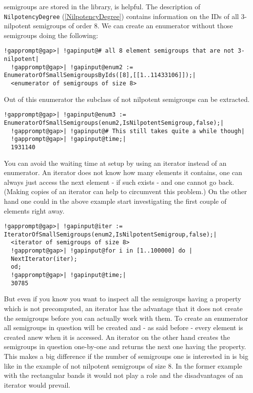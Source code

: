 \documentclass[a4paper,11pt]{report}
\begin{document}
{{{semigroups are stored in the library, is helpful. The description of \texttt{NilpotencyDegree} (\ref{NilpotencyDegree}) contains information on the IDs of all 3-nilpotent semigroups of order 8. We
can create an enumerator without those semigroups doing the following: 
\begin{Verbatim}[commandchars=!@|,fontsize=\small,frame=single,label=Example]
  !gapprompt@gap>| !gapinput@# all 8 element semigroups that are not 3-nilpotent|
  !gapprompt@gap>| !gapinput@enum2 := EnumeratorOfSmallSemigroupsByIds([8],[[1..11433106]]);|
  <enumerator of semigroups of size 8>
\end{Verbatim}
 Out of this enumerator the subclass of not nilpotent semigroups can be
extracted. 
\begin{Verbatim}[commandchars=!@|,fontsize=\small,frame=single,label=Example]
  !gapprompt@gap>| !gapinput@enum3 := EnumeratorOfSmallSemigroups(enum2,IsNilpotentSemigroup,false);|
  !gapprompt@gap>| !gapinput@# This still takes quite a while though|
  !gapprompt@gap>| !gapinput@time;|
  1931140
\end{Verbatim}
 You can avoid the waiting time at setup by using an iterator instead of an
enumerator. An iterator does not know how many elements it contains, one can
always just access the next element - if such exists - and one cannot go back.
(Making copies of an iterator can help to circumvent this problem.) On the
other hand one could in the above example start investigating the first couple
of elements right away. 
\begin{Verbatim}[commandchars=!@|,fontsize=\small,frame=single,label=Example]
  !gapprompt@gap>| !gapinput@iter := IteratorOfSmallSemigroups(enum2,IsNilpotentSemigroup,false);|
  <iterator of semigroups of size 8>
  !gapprompt@gap>| !gapinput@for i in [1..100000] do |
  NextIterator(iter);
  od;
  !gapprompt@gap>| !gapinput@time;|
  30785
\end{Verbatim}
 But even if you know you want to inspect all the semigroups having a property
which is not precomputed, an iterator has the advantage that it does not
create the semigroups before you can actually work with them. To create an
enumerator all semigroups in question will be created and - as said before -
every element is created anew when it is accessed. An iterator on the other
hand creates the semigroups in question one-by-one and returns the next one
having the property. This makes a big difference if the number of semigroups
one is interested in is big like in the example of not nilpotent semigroups of
size 8. In the former example with the rectangular bands it would not play a
role and the disadvantages of an iterator would prevail. 

}}}
\end{document}
